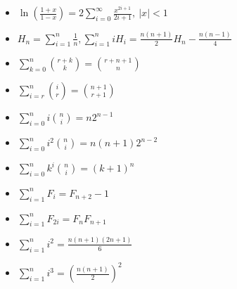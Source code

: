 \begin{itemize}
    \item $\ln\left(\frac{1+x}{1-x}\right) = 2 \sum\limits_{i=0}^\infty \frac{x^{2i+1}}{2i+1}, \ |x| < 1$

    \item $H_n = \sum\limits_{i=1}^n \frac{1}{n}, \sum\limits_{i=1}^n iH_i = \frac{n(n+1)}{2}H_n - \frac{n(n-1)}{4}$

    \item $\sum\limits_{k=0}^n\binom{r+k}{k} =\binom{r+n+1}{n}$

    \item $\sum\limits_{i=r}^n\binom{i}{r} =\binom{n+1}{r+1}$

    \item $\sum\limits_{i=0}^n i\binom{n}{i} = n2^{n-1}$   
    \item $\sum\limits_{i=0}^n i^2\binom{n}{i} = n(n+1)2^{n-2}$
    \item $\sum\limits_{i=0}^n k^i \binom{n}{i} = (k+1)^n$
    \item $\sum\limits_{i=1}^n F_i = F_{n+2} - 1$
    \item $\sum\limits_{i=1}^n F_{2i} = F_n F_{n+1}$
    \item $\sum\limits_{i=1}^n i^2 = \frac{n(n+1)(2n+1)}{6}$
    \item $\sum\limits_{i=1}^n i^3 = \left(\frac{n(n+1)}{2}\right)^2$
\end{itemize}

